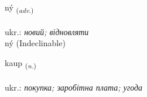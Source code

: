 \documentclass[frontgrid, backgrid]{flacards}\usepackage[]{graphicx}\usepackage[]{xcolor}
\begin{document}
\renewcommand{\flhead}{\vskip5pt \fboxsep=0pt {\small\bfseries\footnotesize Atviksorð | прислівник}}
\renewcommand{\fcfoot}{\vskip5pt \fboxsep=0pt \hspace{2pt}{\small\bfseries\footnotesize 1K}}

\renewcommand{\blhead}{\vskip5pt {\small\bfseries\footnotesize Atviksorð | прислівник }}
\renewcommand{\bcfoot}{\vskip5pt \hspace{2pt}{\small\bfseries\footnotesize 1K}}


{ný \small{\textsubscript{(\textit{adv.})}} \\[1ex]
\textphonetic{[niː]} \\
ukr.: \emph{новий; відновляти} \\  [2ex]
ný (Indeclinable)}

\renewcommand{\flhead}{\vskip5pt \fboxsep=0pt {\small\bfseries\footnotesize Nafnorð | іменник}}
\renewcommand{\fcfoot}{\vskip5pt \fboxsep=0pt \hspace{2pt}{\small\bfseries\footnotesize 1K}}

\renewcommand{\blhead}{\vskip5pt {\small\bfseries\footnotesize Nafnorð | іменник }}
\renewcommand{\bcfoot}{\vskip5pt \hspace{2pt}{\small\bfseries\footnotesize 1K}}


{kaup \small{\textsubscript{(\textit{n.})}} \\[1ex] %
\textphonetic{[kʰœiːp]} \\
ukr.: \emph{покупка; заробітна плата; угода} \\  [2ex]
\renewcommand*{\arraystretch}{0.8}
}

\renewcommand{\flhead}{\vskip5pt \fboxsep=0pt {\small\bfseries\footnotesize Nafnorð | іменник}}
\renewcommand{\fcfoot}{\vskip5pt \fboxsep=0pt \hspace{2pt}{\small\bfseries\footnotesize 1K}}
\end{document}
